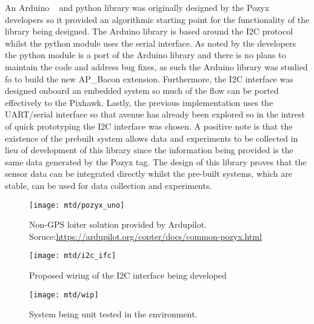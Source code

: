 An Arduino ~\cite{pozarduino} and python library was originally designed by the Pozyx developers so it provided an algorithmic starting point for the functionality of the library being designed.
The Arduino library is based around the I2C protocol whilst the python module uses the serial interface.
As noted by the developers the python module is a port of the Arduino library and there is no plans to maintain the code and address bug fixes, as such the Arduino library was studied fo to build the new AP\_Bacon extension.
Furthermore, the I2C interface was designed onboard an embedded system so much of the flow can be ported effectively to the Pixhawk.
Lastly, the previous implementation uses the UART/serial interface so that avenue has already been explored so in the intrest of quick prototyping the I2C interface was chosen.
A positive note is that the existence of the prebuilt system allows data and experiments to be collected in lieu of development of this library since the information being provided is the same data generated by the Pozyx tag.
The design of this library proves that the sensor data can be integrated directly whilst the pre-built systems, which are stable, can be used for data collection and experiments.
%


\begin{figure}[ht!]
    \centering
    \texttt{[image: mtd/pozyx\_uno]}
    \caption{Non-GPS loiter solution provided by Ardupilot. Soruce:\url{https://ardupilot.org/copter/docs/common-pozyx.html}}
\end{figure}

\begin{figure}[ht!]
    \centering
    \texttt{[image: mtd/i2c\_ifc]}
    \caption{Proposed wiring of the I2C interface being developed}
\end{figure}

\begin{figure}[ht!]
    \centering
    \texttt{[image: mtd/wip]}
    \caption{System being unit tested in the environment.}
\end{figure}
\newpage
